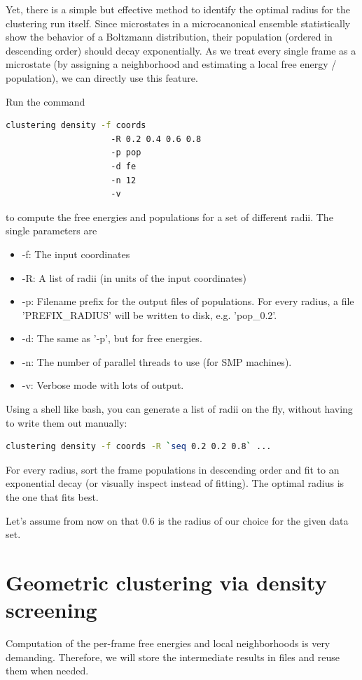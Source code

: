 \documentclass[12pt,a4paper,twoside,english,fleqn]{article}
\begin{document}
Yet, there is a simple but effective method to identify the optimal radius for
the clustering run itself. Since microstates in a microcanonical ensemble
statistically show the behavior of a Boltzmann distribution, their population
(ordered in descending order) should decay exponentially.
As we treat every single frame as a microstate (by assigning a neighborhood
and estimating a local free energy / population), we can directly use this
feature.

Run the command

\begin{lstlisting}[language=bash,basicstyle=\ttfamily]
  clustering density -f coords
                     -R 0.2 0.4 0.6 0.8
                     -p pop
                     -d fe
                     -n 12
                     -v
\end{lstlisting}

to compute the free energies and populations for a set of different radii.
The single parameters are
\begin{itemize}
  \item -f: The input coordinates
  \item -R: A list of radii (in units of the input coordinates)
  \item -p: Filename prefix for the output files of populations.
            For every radius, a file 'PREFIX\_RADIUS' will be written
            to disk, e.g. 'pop\_0.2'.
  \item -d: The same as '-p', but for free energies.
  \item -n: The number of parallel threads to use (for SMP machines).
  \item -v: Verbose mode with lots of output.
\end{itemize}

Using a shell like bash, you can generate a list of radii on the fly, without
having to write them out manually:
\begin{lstlisting}[language=bash,basicstyle=\ttfamily]
  clustering density -f coords -R `seq 0.2 0.2 0.8` ...
\end{lstlisting}

For every radius, sort the frame populations in descending order and fit to an
exponential decay (or visually inspect instead of fitting).
The optimal radius is the one that fits best.

Let's assume from now on that 0.6 is the radius of our choice for the given
data set.


\section{Geometric clustering via density screening}
Computation of the per-frame free energies and local neighborhoods is very
demanding. Therefore, we will store the intermediate results in files and reuse
them when needed.
\end{document}
